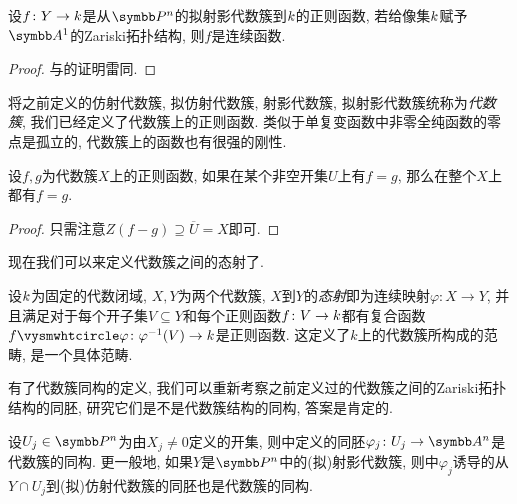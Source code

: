 \begin{proposition}\label{prop:projregularcontinuous}
  设$f\colon Y\to k$是从$\PP^n$的拟射影代数簇到$k$的正则函数, 若给像集$k$赋予$\AF^1$的Zariski拓扑结构, 则$f$是连续函数.
\end{proposition}

\begin{proof}
  与的证明雷同.
\end{proof}

将之前定义的仿射代数簇, 拟仿射代数簇, 射影代数簇, 拟射影代数簇统称为\emph{代数簇}, 我们已经定义了代数簇上的正则函数. 类似于单复变函数中非零全纯函数的零点是孤立的\parencite[127]{ahlfors_complex_1978}, 代数簇上的函数也有很强的刚性.

\begin{proposition}\label{prop:regularstiffness}
  设$f, g$为代数簇$X$上的正则函数, 如果在某个非空开集$U$上有$f=g$, 那么在整个$X$上都有$f=g$.
\end{proposition}

\begin{proof}
  只需注意$Z(f-g)\supseteq \overline{U}=X$即可.
\end{proof}

现在我们可以来定义代数簇之间的态射了.

\begin{definition}
  设$k$为固定的代数闭域, $X, Y$为两个代数簇, $X$到$Y$的\emph{态射}即为连续映射$\varphi\colon X\to Y$, 并且满足对于每个开子集$V\subseteq Y$和每个正则函数$f\colon V\to k$都有复合函数$f\composite\varphi\colon\varphi^{-1}(V)\to \kk$是正则函数. 这定义了$k$上的代数簇所构成的范畴, 是一个具体范畴.
\end{definition}

有了代数簇同构的定义, 我们可以重新考察之前定义过的代数簇之间的Zariski拓扑结构的同胚, 研究它们是不是代数簇结构的同构, 答案是肯定的.

\begin{proposition}\label{prop:projectiveopencoverisomorphism}
  设$U_j\in \PP^n$为由$X_j\neq 0$定义的开集, 则中定义的同胚$\varphi_j\colon U_j\to \AF^n$是代数簇的同构. 更一般地, 如果$Y$是$\PP^n$中的(拟)射影代数簇, 则中$\varphi_j$诱导的从$Y\cap U_j$到(拟)仿射代数簇的同胚也是代数簇的同构.
\end{proposition}

